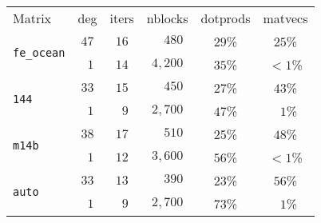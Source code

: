 \begin{tabular}{l|c|c|c|c|c}
\hline
\multirow{2}{*}{Matrix} & \multirow{2}{*}{deg} & \multirow{2}{*}{iters} & \multirow{2}{*}{nblocks} & \multirow{2}{*}{dotprods}& \multirow{2}{*}{matvecs} \\
 & & & & & \\\hline
\hline
\multirow{2}{*}{\texttt{fe\_ocean}} & $47$ & $16$ & $\phantom{0,{}}480$ & $29$\% & $25$\%\\
  & $\phantom{0}1$ & $14$ & $4,200$ & $35$\% & ${}<1$\%\\\hline
\multirow{2}{*}{\texttt{144}} & $33$ & $15$ & $\phantom{0,{}}450$ & $27$\% & $43$\%\\
  & $\phantom{0}1$ & $\phantom{0}9$ & $2,700$ & $47$\% & $\phantom{0}1$\%\\\hline
\multirow{2}{*}{\texttt{m14b}} & $38$ & $17$ & $\phantom{0,{}}510$ & $25$\% & $48$\%\\
  & $\phantom{0}1$ & $12$ & $3,600$ & $56$\% & ${}<1$\%\\\hline
\multirow{2}{*}{\texttt{auto}} & $33$ & $13$ & $\phantom{0,{}}390$ & $23$\% & $56$\%\\
  & $\phantom{0}1$ & $\phantom{0}9$ & $2,700$ & $73$\% & $\phantom{0}1$\%\\\hline
\end{tabular}